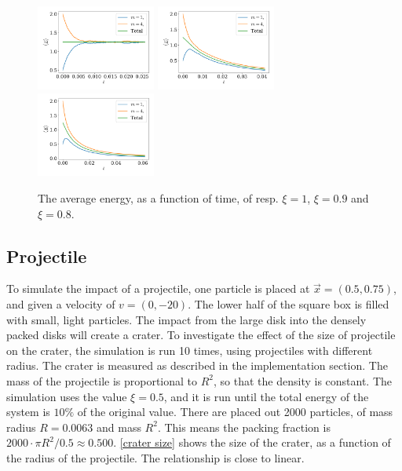\documentclass{article}
\begin{document}
    \begin{figure}[H]
        \centering
        \hspace{-5mm}
        \includegraphics[width=0.35\textwidth]{../plots/problem3/xi_0/energy_ex3.pdf}
        \hspace{-4mm}
        \includegraphics[width=0.35\textwidth]{../plots/problem3/xi_1/energy_ex3.pdf}
        \hspace{-4mm}
        \includegraphics[width=0.35\textwidth]{../plots/problem3/xi_2/energy_ex3.pdf}
        \hspace{-5mm}
        \caption{The average energy, as a function of time, of resp. $\xi=1$, $\xi=0.9$ and $\xi=0.8$.}
        \label{problem2 av en}
    \end{figure}

    \subsection*{Projectile}
    To simulate the impact of a projectile, one particle is placed at $\vec x = (0.5, 0.75)$, and given a velocity of $v = (0, -20)$. The lower half of the square box is filled with small, light particles. The impact from the large disk into the densely packed disks will create a crater. To investigate the effect of the size of projectile on the crater, the simulation is run 10 times, using projectiles with different radius. The crater is measured as described in the implementation section. The mass of the projectile is proportional to $R^2$, so that the density is constant. The simulation uses the value $\xi = 0.5$, and it is run until the total energy of the system is $10\%$ of the original value. There are placed out 2000 particles, of mass radius $R=0.0063$ and mass $R^2$. This means the packing fraction is $2000 \cdot \pi R^2 / 0.5 \approx 0.500$. \autoref{crater size} shows the size of the crater, as a function of the radius of the projectile. The relationship is close to linear.
\end{document}
